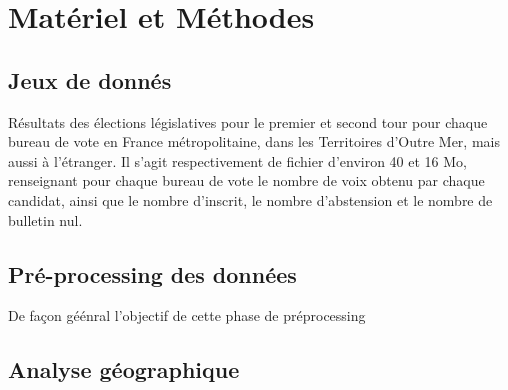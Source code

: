 \documentclass[11pt]{article}
\begin{document}
    \newpage
    \section{Matériel et Méthodes}

        \subsection*{Jeux de donnés}
            Résultats des élections législatives pour le premier et second tour pour chaque bureau de vote en France métropolitaine, dans les Territoires d'Outre Mer, mais aussi à  l'étranger. Il s'agit respectivement de fichier d'environ 40 et 16 Mo, renseignant pour chaque bureau de vote le nombre de voix obtenu par chaque candidat, ainsi que le nombre d'inscrit, le nombre d'abstension et le nombre de bulletin nul.
        
        \subsection*{Pré-processing des données}
            De façon géénral l'objectif de cette phase de préprocessing 

        \subsection*{Analyse géographique}
\end{document}
